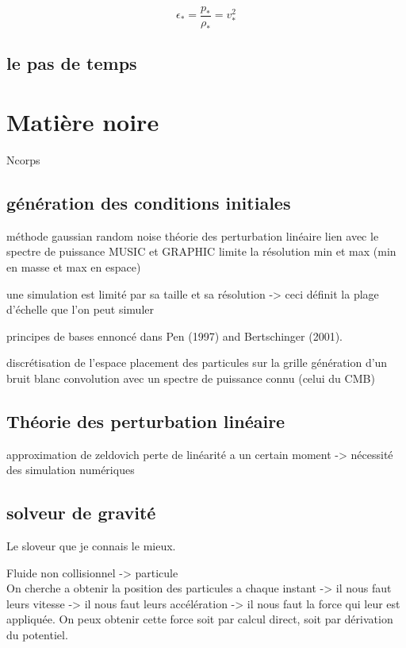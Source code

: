 \begin{equation}
\epsilon_* = \frac{p_*}{\rho_*} = v_*^2
\end{equation}




\subsection{le pas de temps}

\section{Matière noire}
Ncorps

\subsection{génération des conditions initiales}

méthode
gaussian random noise
théorie des perturbation linéaire
lien avec le spectre de puissance
MUSIC et GRAPHIC
limite la résolution min et max (min en masse et max en espace)


une simulation est limité par sa taille et sa résolution -> ceci définit la plage d'échelle que l'on peut simuler

principes de bases ennoncé dans Pen (1997) and Bertschinger (2001).

    discrétisation de l'espace
    placement des particules sur la grille
    génération d'un bruit blanc
    convolution avec un spectre de puissance connu (celui du CMB)


\subsection{Théorie des perturbation linéaire}

approximation de zeldovich
perte de linéarité a un certain moment -> nécessité des simulation numériques





\subsection{solveur de gravité}
Le sloveur que je connais le mieux.

Fluide non collisionnel -> particule\\
On cherche a obtenir la position des particules a chaque instant -> il nous faut leurs vitesse -> il nous faut leurs accélération -> il nous faut la force qui leur est appliquée.
On peux obtenir cette force soit par calcul direct, soit par dérivation du potentiel.

